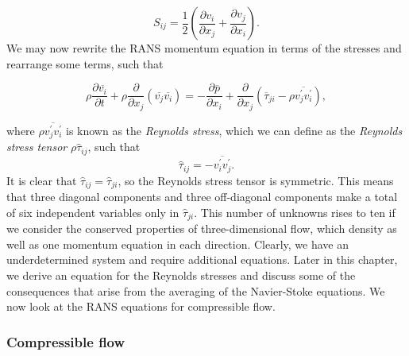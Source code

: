 \begin{equation}
    S_{ij} = \frac{1}{2}\left(\frac{\partial v_i}{\partial x_j}+\frac{\partial v_j
    }{\partial x_i}\right).
\end{equation}
We may now rewrite the RANS momentum equation in terms of the stresses and rearrange some terms, such that
\begin{eqBox}
\begin{equation}
    \rho \frac{\partial \overline{v_i}}{\partial t} 
    + \rho  \frac{\partial}{\partial x_j} \left(\overline{v_j}\overline{v_i}\right)
    =- \frac{\partial \overline{p}}{\partial x_i} 
	+ \frac{\partial}{\partial x_j} \left(\overline\tau_{ji} - \rho \overline{v_j^\prime v_i^\prime}\right),
	\label{eq:rans_momentum}
\end{equation}
\end{eqBox}
where $\rho \overline{v_j^\prime v_i^\prime}$ is known as the \textit{Reynolds stress}, which we can define as the \textit{Reynolds stress tensor} $\rho\hat\tau_{ij}$, such that
\begin{equation}
	\hat\tau_{ij} = -\overline{v_i^\prime v_j^\prime}.
\end{equation}
It is clear that $\hat\tau_{ij}=\hat\tau_{ji}$, so the Reynolds stress tensor is symmetric. This means that three diagonal components and three off-diagonal components make a total of six independent variables only in $\hat\tau_{ji}$. This number of unknowns rises to ten if we consider the conserved properties of three-dimensional flow, which density as well as one momentum equation in each direction. Clearly, we have an underdetermined system and require additional equations. Later in this chapter, we derive an equation for the Reynolds stresses and discuss some of the consequences that arise from the averaging of the Navier-Stoke equations. We now look at the RANS equations for compressible flow.

\subsubsection{Compressible flow}

